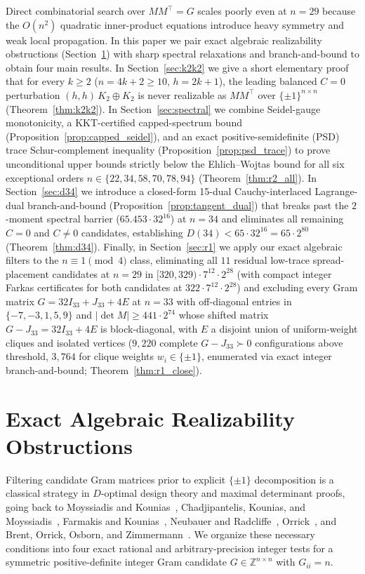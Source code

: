 \documentclass[11pt]{article}
\theoremstyle{remark}
\newcommand{\Z}{\mathbb{Z}}
\begin{document}
Direct combinatorial search over $M M^\top = G$ scales poorly even at $n = 29$ because the $O(n^2)$ quadratic inner-product equations introduce heavy symmetry and weak local propagation. In this paper we pair exact algebraic realizability obstructions (Section~\ref{sec:algebraic}) with sharp spectral relaxations and branch-and-bound to obtain four main results. In Section~\ref{sec:k2k2} we give a short elementary proof that for every $k \ge 2$ ($n = 4k + 2 \ge 10$, $h = 2k + 1$), the leading balanced $C = 0$ perturbation $(h, h)\, K_2 \oplus K_2$ is never realizable as $M M^\top$ over $\{\pm 1\}^{n \times n}$ (Theorem~\ref{thm:k2k2}). In Section~\ref{sec:spectral} we combine Seidel-gauge monotonicity, a KKT-certified capped-spectrum bound (Proposition~\ref{prop:capped_seidel}), and an exact positive-semidefinite (PSD) trace Schur-complement inequality (Proposition~\ref{prop:psd_trace}) to prove unconditional upper bounds strictly below the Ehlich--Wojtas bound for all six exceptional orders $n \in \{22, 34, 58, 70, 78, 94\}$ (Theorem~\ref{thm:r2_all}). In Section~\ref{sec:d34} we introduce a closed-form 15-dual Cauchy-interlaced Lagrange-dual branch-and-bound (Proposition~\ref{prop:tangent_dual}) that breaks past the $2$-moment spectral barrier ($65.453 \cdot 32^{16}$) at $n = 34$ and eliminates all remaining $C = 0$ and $C \ne 0$ candidates, establishing $D(34) < 65 \cdot 32^{16} = 65 \cdot 2^{80}$ (Theorem~\ref{thm:d34}). Finally, in Section~\ref{sec:r1} we apply our exact algebraic filters to the $n \equiv 1 \pmod 4$ class, eliminating all $11$ residual low-trace spread-placement candidates at $n = 29$ in $[320, 329) \cdot 7^{12} \cdot 2^{28}$ (with compact integer Farkas certificates for both candidates at $322 \cdot 7^{12} \cdot 2^{28}$) and excluding every Gram matrix $G = 32 I_{33} + J_{33} + 4E$ at $n = 33$ with off-diagonal entries in $\{-7, -3, 1, 5, 9\}$ and $|\det M| \ge 441 \cdot 2^{74}$ whose shifted matrix $G - J_{33} = 32 I_{33} + 4E$ is block-diagonal, with $E$ a disjoint union of uniform-weight cliques and isolated vertices ($9{,}220$ complete $G - J_{33} \succ 0$ configurations above threshold, $3{,}764$ for clique weights $w_i \in \{\pm 1\}$, enumerated via exact integer branch-and-bound; Theorem~\ref{thm:r1_close}).

\section{Exact Algebraic Realizability Obstructions}\label{sec:algebraic}

Filtering candidate Gram matrices prior to explicit $\{\pm 1\}$ decomposition is a classical strategy in $D$-optimal design theory and maximal determinant proofs, going back to Moyssiadis and Kounias~\cite{moyssiadis1982}, Chadjipantelis, Kounias, and Moyssiadis~\cite{chadjipantelis1987}, Farmakis and Kounias~\cite{farmakis1987}, Neubauer and Radcliffe~\cite{neubauer1997}, Orrick~\cite{orrick2005}, and Brent, Orrick, Osborn, and Zimmermann~\cite{brent2012maximal}. We organize these necessary conditions into four exact rational and arbitrary-precision integer tests for a symmetric positive-definite integer Gram candidate $G \in \Z^{n \times n}$ with $G_{ii} = n$.
\end{document}
